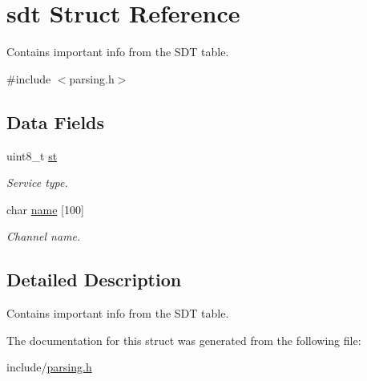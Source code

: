 \hypertarget{structsdt}{}\section{sdt Struct Reference}
\label{structsdt}


Contains important info from the S\+DT table.  




{\ttfamily \#include $<$parsing.\+h$>$}

\subsection*{Data Fields}
\begin{DoxyCompactItemize}
\item 
uint8\+\_\+t \hyperlink{structsdt_a8c814c6244e0242de75f1dbde51aed17}{st}\hypertarget{structsdt_a8c814c6244e0242de75f1dbde51aed17}{}\label{structsdt_a8c814c6244e0242de75f1dbde51aed17}

\begin{DoxyCompactList}\small\item\em Service type. \end{DoxyCompactList}\item 
char \hyperlink{structsdt_a2339e7ee708d4fedf48653d8fae39ab7}{name} \mbox{[}100\mbox{]}\hypertarget{structsdt_a2339e7ee708d4fedf48653d8fae39ab7}{}\label{structsdt_a2339e7ee708d4fedf48653d8fae39ab7}

\begin{DoxyCompactList}\small\item\em Channel name. \end{DoxyCompactList}\end{DoxyCompactItemize}


\subsection{Detailed Description}
Contains important info from the S\+DT table. 

The documentation for this struct was generated from the following file\+:\begin{DoxyCompactItemize}
\item 
include/\hyperlink{parsing_8h}{parsing.\+h}\end{DoxyCompactItemize}
